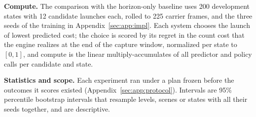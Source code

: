 \textbf{Compute.} The comparison with the horizon-only baseline uses 200 development states with 12 candidate launches each, rolled to 225 carrier frames, and the three seeds of the training in Appendix~\ref{sec:app:impl}. Each system chooses the launch of lowest predicted cost; the choice is scored by its regret in the count cost that the engine realizes at the end of the capture window, normalized per state to $[0,1]$, and compute is the linear multiply-accumulates of all predictor and policy calls per candidate and state.

\textbf{Statistics and scope.} Each experiment ran under a plan frozen before the outcomes it scores existed (Appendix~\ref{sec:app:protocol}). Intervals are 95\% percentile bootstrap intervals that resample levels, scenes or states with all their seeds together, and are descriptive.

